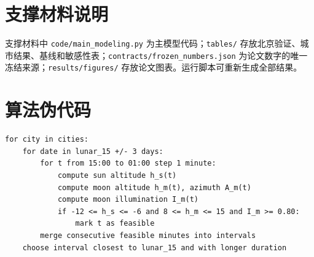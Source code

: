 \documentclass[UTF8,a4paper,12pt]{ctexart}
\begin{document}
\appendix
\section{支撑材料说明}
支撑材料中 \texttt{code/main\_modeling.py} 为主模型代码；\texttt{tables/} 存放北京验证、城市结果、基线和敏感性表；\texttt{contracts/frozen\_numbers.json} 为论文数字的唯一冻结来源；\texttt{results/figures/} 存放论文图表。运行脚本可重新生成全部结果。

\section{算法伪代码}
\begin{verbatim}
for city in cities:
    for date in lunar_15 +/- 3 days:
        for t from 15:00 to 01:00 step 1 minute:
            compute sun altitude h_s(t)
            compute moon altitude h_m(t), azimuth A_m(t)
            compute moon illumination I_m(t)
            if -12 <= h_s <= -6 and 8 <= h_m <= 15 and I_m >= 0.80:
                mark t as feasible
        merge consecutive feasible minutes into intervals
    choose interval closest to lunar_15 and with longer duration
\end{verbatim}
\end{document}
